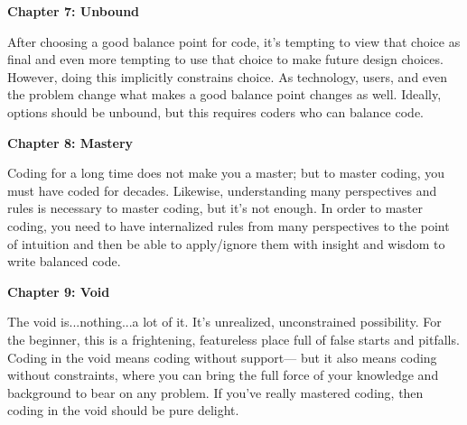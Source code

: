 \begin{adjustwidth}{0.25in}{0in}
\textbf{Chapter 7: Unbound}

After choosing a good balance point for code, it's tempting to view that choice
as final and even more tempting to use that choice to make future design
choices. However, doing this implicitly constrains choice. As technology,
users, and even the problem change what makes a good balance point changes as
well. Ideally, options should be unbound, but this requires coders who can
balance code. 

\textbf{Chapter 8: Mastery}

Coding for a long time does not make you a master; but to master coding, you
must have coded for decades. Likewise, understanding many perspectives and
rules is necessary to master coding, but it's not enough. In order to master
coding, you need to have internalized rules from many perspectives to the point
of intuition and then be able to apply/ignore them with insight and wisdom to
write balanced code.


\textbf{Chapter 9: Void}

The void is...nothing...a lot of it. It's unrealized, unconstrained
possibility. For the beginner, this is a frightening, featureless place full of
false starts and pitfalls.  Coding in the void means coding without support---
but it also means coding without constraints, where you can bring the full
force of your knowledge and background to bear on any problem. If you've really
mastered coding, then coding in the void should be pure delight.

\end{adjustwidth}
